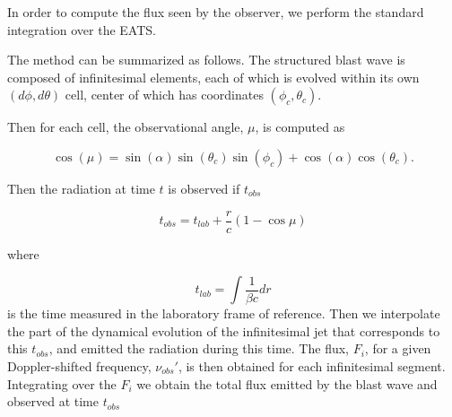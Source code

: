 In order to compute the flux seen by the observer, we perform the standard 
integration over the \ac{EATS}.

The method can be summarized as follows.
The structured blast wave is composed of infinitesimal elements,
each of which is evolved within its own $(d\phi, d\theta)$
cell, center of which has coordinates $(\phi_c, \theta_c)$.

Then for each cell, the observational angle, $\mu$, is computed as 

\begin{equation}
    \cos(\mu) = \sin(\alpha) \sin(\theta_c) \sin(\phi_c) 
     + \cos(\alpha) \cos(\theta_c).
\end{equation}

Then the radiation at time $t$ is observed if $t_{obs}$

\begin{equation}
    t_{obs} = t_{lab} +\frac{r}{c}(1 - \cos{\mu})
\end{equation}

where 

\begin{equation}
t_{lab} = \int \frac{1}{\beta c} dr
\end{equation}
%
is the time measured in the laboratory frame of reference.
%
Then we interpolate the part of the dynamical evolution
of the infinitesimal jet that corresponds to this $t_{obs}$,
and emitted the radiation during this time.
The flux, $F_i$, for a given Doppler-shifted frequency, 
$\nu_{obs}'$, is then obtained for each infinitesimal segment.
Integrating over the $F_i$ we obtain the total flux emitted by the 
blast wave and observed at time $t_{obs}$
